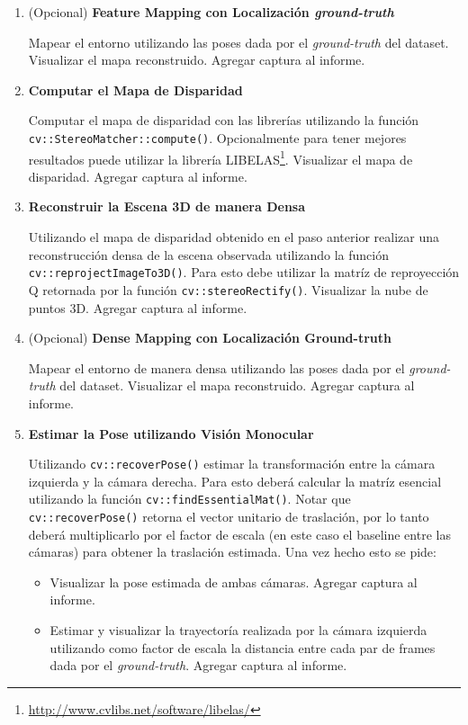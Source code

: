 \documentclass[tp]{lcc}
\begin{document}
\begin{enumerate}
\item (Opcional) \textbf{Feature Mapping con Localización \emph{ground-truth}}

Mapear el entorno utilizando las poses dada por el \emph{ground-truth} del dataset. Visualizar el mapa reconstruido. Agregar captura al informe.

\item \textbf{Computar el Mapa de Disparidad}

Computar el mapa de disparidad con las librerías utilizando la función \lstinline{cv::StereoMatcher::compute()}. Opcionalmente para tener mejores resultados puede utilizar la librería LIBELAS\footnote{\url{http://www.cvlibs.net/software/libelas/}}. Visualizar el mapa de disparidad. Agregar captura al informe.

\item \textbf{Reconstruir la Escena 3D de manera Densa}

Utilizando el mapa de disparidad obtenido en el paso anterior realizar una reconstrucción densa de la escena observada utilizando la función \lstinline{cv::reprojectImageTo3D()}. Para esto debe utilizar la matríz de reproyección Q retornada por la función \lstinline{cv::stereoRectify()}. Visualizar la nube de puntos 3D. Agregar captura al informe.

\item (Opcional) \textbf{Dense Mapping con Localización Ground-truth}

Mapear el entorno de manera densa utilizando las poses dada por el \emph{ground-truth} del dataset. Visualizar el mapa reconstruido. Agregar captura al informe.

\item \textbf{Estimar la Pose utilizando Visión Monocular}

Utilizando \lstinline{cv::recoverPose()} estimar la transformación entre la cámara izquierda y la cámara derecha. Para esto deberá calcular la matríz esencial utilizando la función \lstinline{cv::findEssentialMat()}. Notar que \lstinline{cv::recoverPose()} retorna el vector unitario de traslación, por lo tanto deberá multiplicarlo por el factor de escala (en este caso el baseline entre las cámaras) para obtener la traslación estimada. Una vez hecho esto se pide:

\begin{itemize}
    \item Visualizar la pose estimada de ambas cámaras. Agregar captura al informe.
    \item Estimar y visualizar la trayectoría realizada por la cámara izquierda utilizando como factor de escala la distancia entre cada par de frames dada por el \emph{ground-truth}. Agregar captura al informe.
\end{itemize}


\end{enumerate}
\end{document}
